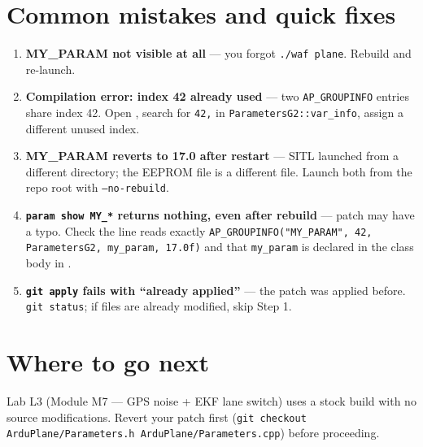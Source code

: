 \documentclass[a4paper,11pt,twoside]{article}
\begin{document}
\section*{Common mistakes and quick fixes}

\begin{enumerate}
  \item \textbf{MY\_PARAM not visible at all} --- you forgot \texttt{./waf plane}. Rebuild and re-launch.
  \item \textbf{Compilation error: index 42 already used} --- two \texttt{AP\_GROUPINFO} entries share index 42. Open , search for \texttt{42,} in \texttt{ParametersG2::var\_info}, assign a different unused index.
  \item \textbf{MY\_PARAM reverts to 17.0 after restart} --- SITL launched from a different directory; the EEPROM file is a different file. Launch both from the repo root with \texttt{--no-rebuild}.
  \item \textbf{\texttt{param show MY\_*} returns nothing, even after rebuild} --- patch may have a typo. Check the line reads exactly \texttt{AP\_GROUPINFO("MY\_PARAM", 42, ParametersG2, my\_param, 17.0f)} and that \texttt{my\_param} is declared in the class body in .
  \item \textbf{\texttt{git apply} fails with ``already applied''} --- the patch was applied before. \texttt{git status}; if files are already modified, skip Step 1.
\end{enumerate}

\section*{Where to go next}

Lab L3 (Module M7 --- GPS noise + EKF lane switch) uses a stock build with no source modifications. Revert your patch first (\texttt{git checkout ArduPlane/Parameters.h ArduPlane/Parameters.cpp}) before proceeding.

\fi
\end{document}
